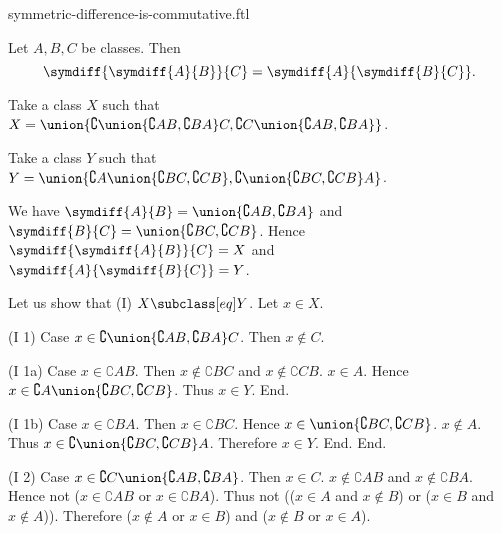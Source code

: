 \documentclass{article}
\begin{document}
\begin{smodule}[creators={Marcel Schütz}]{symmetric-difference-is-commutative.ftl}

  \begin{fproposition*}[label=8814809074106368]
    Let $A, B, C$ be classes.
    Then \[\symdiff{\symdiff{A}{B}}{C} = \symdiff{A}{\symdiff{B}{C}}. \]
  \end{fproposition*}
  \begin{fproof}
    Take a class $X$ such that $X = \union{\complement{\union{\complement{A}{B},\complement{B}{A}}}{C},\complement{C}{\union{\complement{A}{B},\complement{B}{A}}}}$.

    Take a class $Y$ such that $Y = \union{\complement{A}{\union{\complement{B}{C},\complement{C}{B}}},\complement{\union{\complement{B}{C},\complement{C}{B}}}{A}}$.

    We have $\symdiff{A}{B} = \union{\complement{A}{B},\complement{B}{A}}$ and
    $\symdiff{B}{C} = \union{\complement{B}{C},\complement{C}{B}}$.
    Hence $\symdiff{\symdiff{A}{B}}{C} = X$ and $\symdiff{A}{\symdiff{B}{C}} = Y$.

    Let us show that (I) $X \subclass[eq] Y$.
      Let $x \in X$.

      (I 1) Case $x \in \complement{\union{\complement{A}{B},\complement{B}{A}}}{C}$.
        Then $x \notin C$.

        (I 1a) Case $x \in \complement{A}{B}$.
          Then $x \notin \complement{B}{C}$ and $x \notin \complement{C}{B}$.
          $x \in A$.
          Hence $x \in \complement{A}{\union{\complement{B}{C},\complement{C}{B}}}$.
          Thus $x \in Y$.
        End.

        (I 1b) Case $x \in \complement{B}{A}$.
          Then $x \in \complement{B}{C}$.
          Hence $x \in \union{\complement{B}{C},\complement{C}{B}}$.
          $x \notin A$.
          Thus $x \in \complement{\union{\complement{B}{C},\complement{C}{B}}}{A}$.
          Therefore $x \in Y$.
        End.
      End.

      (I 2) Case $x \in \complement{C}{\union{\complement{A}{B},\complement{B}{A}}}$.
        Then $x \in C$.
        $x \notin \complement{A}{B}$ and $x \notin \complement{B}{A}$.
        Hence not ($x \in \complement{A}{B}$ or $x \in \complement{B}{A}$).
        Thus not (($x \in A$ and $x \notin B$) or ($x \in B$ and $x \notin A$)).
        Therefore ($x \notin A$ or $x \in B$) and ($x \notin B$ or $x \in A$).


\end{fproof}
\end{smodule}
\end{document}
